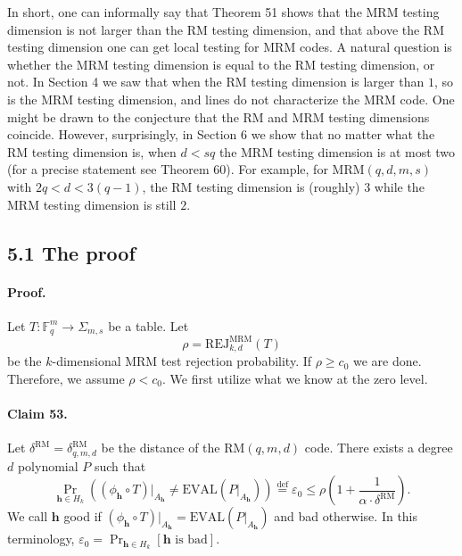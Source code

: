 \documentclass[10pt,a4paper]{article}
\begin{document}
In short, one can informally say that Theorem 51 shows that the MRM testing dimension is not larger than the RM testing dimension, and that above the RM testing dimension one can get local testing for MRM codes. A natural question is whether the MRM testing dimension is equal to the RM testing dimension, or not. In Section 4 we saw that when the RM testing dimension is larger than $1$, so is the MRM testing dimension, and lines do not characterize the MRM code. One might be drawn to the conjecture that the RM and MRM testing dimensions coincide. However, surprisingly, in Section 6 we show that no matter what the RM testing dimension is, when $d<sq$ the MRM testing dimension is at most two (for a precise statement see Theorem 60). For example, for $\mathrm{MRM}(q,d,m,s)$ with $2q<d<3(q-1)$, the RM testing dimension is (roughly) $3$ while the MRM testing dimension is still $2$.
\subsection*{5.1 The proof}
\paragraph{Proof.} Let $T:\mathbb F_q^m\to\Sigma_{m,s}$ be a table. Let
\[\rho=\mathrm{REJ}_{k,d}^{\mathrm{MRM}}(T)\]
be the $k$-dimensional MRM test rejection probability. If $\rho\geq c_0$ we are done. Therefore, we assume $\rho<c_0$. We first utilize what we know at the zero level.
\paragraph{Claim 53.} Let $\delta^{\mathrm{RM}}=\delta_{q,m,d}^{\mathrm{RM}}$ be the distance of the $\mathrm{RM}(q,m,d)$ code. There exists a degree $d$ polynomial $P$ such that
\[\Pr_{\boldsymbol h\in H_k}((\phi_{\boldsymbol h}\circ T)|_{A_{\boldsymbol h}}\neq\mathrm{EVAL}(P|_{A_{\boldsymbol h}}))\stackrel{\mathrm{def}}=\varepsilon_0\leq\rho\left(1+\frac1{\alpha\cdot\delta^{\mathrm{RM}}}\right).\]
We call $\boldsymbol h$ good if $(\phi_{\boldsymbol h}\circ T)|_{A_{\boldsymbol h}}=\mathrm{EVAL}(P|_{A_{\boldsymbol h}})$ and bad otherwise. In this terminology, $\varepsilon_0=\Pr_{\boldsymbol h\in H_k}[\boldsymbol h\text{ is bad}]$.
\end{document}
